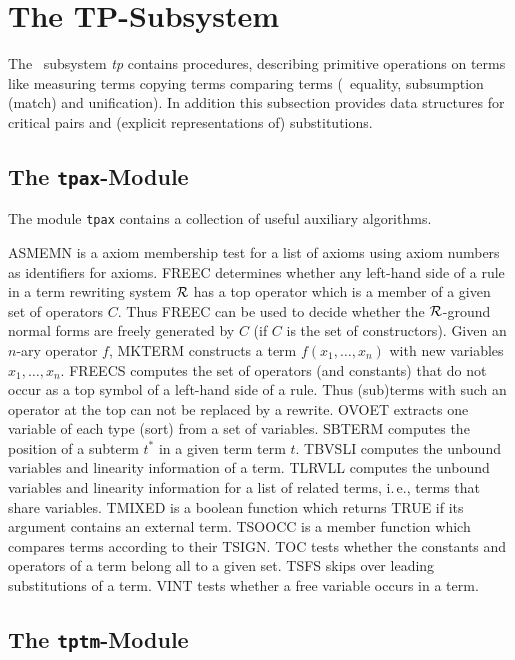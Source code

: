\section{The TP-Subsystem} \label{se:tp}

The \redux\ subsystem {\it tp} contains procedures, describing primitive
operations on terms like measuring terms copying terms comparing
terms (\wrt\ equality, subsumption (match) and unification).
In addition this subsection provides data structures for
critical pairs and (explicit representations of) substitutions.

\subsection{The {\tt tpax}-Module}

The module {\tt tpax} contains a collection of useful auxiliary algorithms.

ASMEMN is a axiom membership test for a list of axioms using
axiom numbers as identifiers for axioms.
FREEC determines whether any left-hand side of a rule in a term rewriting 
system $\cal R$ has a top operator which is a member of a given set of 
operators $C$.
Thus FREEC can be used to decide whether the $\cal R$-ground normal forms
are freely generated by $C$ (if $C$ is the set of constructors).
Given an $n$-ary operator $f$, MKTERM constructs a term $f(x_1,\ldots,x_n)$
with new variables $x_1,\ldots,x_n$.
FREECS computes the set of operators (and constants) that do not occur
as a top symbol of a left-hand side of a rule.
Thus (sub)terms with such an operator at the top can not be replaced by a
rewrite.
OVOET extracts one variable of each type (sort) from a set of variables.
SBTERM computes the position of a subterm $t^*$ in a given term term $t$.
TBVSLI computes the unbound variables and linearity information of a term.
TLRVLL computes the unbound variables and linearity information for a list
of related terms,
i.\,e., terms that share variables.
TMIXED is a boolean function which returns TRUE if its argument contains an
external term.
TSOOCC is a member function which compares terms according to their TSIGN.
TOC tests whether the constants and operators of a term belong all to a 
given set.
TSFS skips over leading substitutions of a term. 
VINT tests whether a free variable occurs in a term.

\subsection{The {\tt tptm}-Module}

